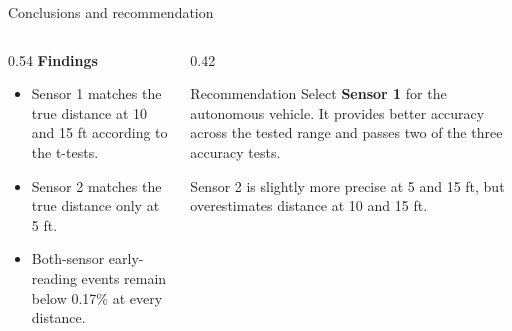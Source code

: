\documentclass[aspectratio=169,14pt]{beamer}
\begin{document}
\begin{frame}{Conclusions and recommendation}
    \begin{columns}[T,onlytextwidth]
        \begin{column}{0.54\textwidth}
            \textbf{Findings}
            \begin{itemize}
                \item Sensor 1 matches the true distance at 10 and 15 ft according to the t-tests.
                \item Sensor 2 matches the true distance only at 5 ft.
                \item Both-sensor early-reading events remain below 0.17\% at every distance.
            \end{itemize}
        \end{column}
        \begin{column}{0.42\textwidth}
            \begin{block}{Recommendation}
                Select \textbf{Sensor 1} for the autonomous vehicle. It provides better accuracy across the tested range and passes two of the three accuracy tests.
            \end{block}

            \vspace{0.25cm}
            \small Sensor 2 is slightly more precise at 5 and 15 ft, but overestimates distance at 10 and 15 ft.
        \end{column}
    \end{columns}
\end{frame}
\end{document}
